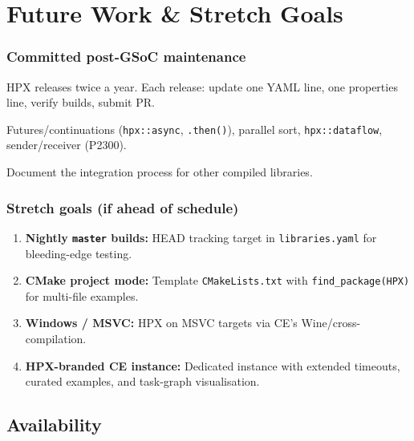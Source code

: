 \documentclass[11pt, a4paper]{article}
\newcommand{\code}[1]{\texttt{#1}}
\begin{document}
\section*{Future Work \& Stretch Goals}

\subsubsection*{Committed post-GSoC maintenance}

\begin{description}[leftmargin=1.5em, itemsep=3pt]
  \item[Version maintenance:]
    HPX releases twice a year.  Each release: update one YAML line,
    one properties line, verify builds, submit PR.

  \item[Example gallery:]
    Futures/continuations (\code{hpx::async}, \code{.then()}), parallel
    sort, \code{hpx::dataflow}, sender/receiver (P2300).

  \item[Complex-library guide:]
    Document the integration process for other compiled libraries.
\end{description}

\subsubsection*{Stretch goals (if ahead of schedule)}

\begin{enumerate}[leftmargin=2em, itemsep=3pt]
  \item \textbf{Nightly \code{master} builds:} HEAD tracking target
        in \code{libraries.yaml} for bleeding-edge testing.
  \item \textbf{CMake project mode:} Template \code{CMakeLists.txt}
        with \code{find\_package(HPX)} for multi-file examples.
  \item \textbf{Windows / MSVC:} HPX on MSVC targets via CE's
        Wine/cross-compilation.
  \item \textbf{HPX-branded CE instance:} Dedicated instance with
        extended timeouts, curated examples, and task-graph visualisation.
\end{enumerate}

\subsection*{Availability}
\end{document}
